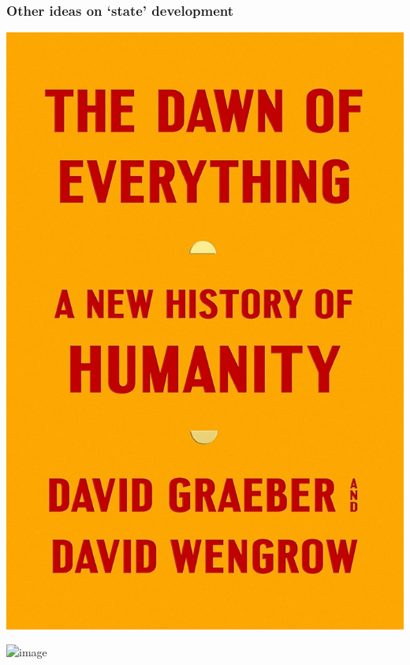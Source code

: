 \documentclass[aspectratio=43, handout]{beamer}
\begin{document}
\begin{frame}
\frametitle{Other ideas on `state' development}
\centering

\begin{minipage}{.49\textwidth}\centering
\includegraphics[width = .9\textwidth]{img/graeber_wengrow}
\end{minipage}\hfill
\begin{minipage}{.49\textwidth}\centering
\includegraphics<2>[width = .9\textwidth]{img/scott_against}
\end{minipage}
  

\end{frame}


\end{document}

